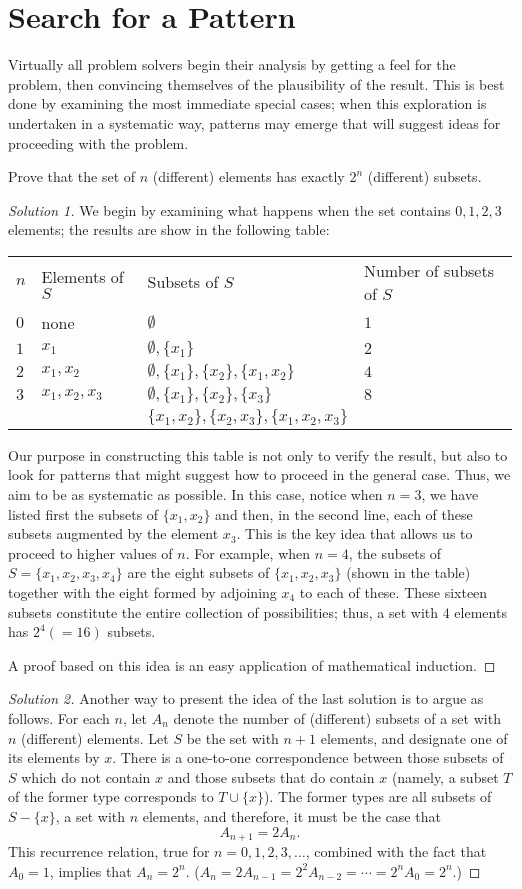 \section{Search for a Pattern}
Virtually all problem solvers begin their analysis by getting a feel for
the problem, then convincing themselves of the plausibility of the
result. This is best done by examining the most immediate special cases;
when this exploration is undertaken in a systematic way, patterns may
emerge that will suggest ideas for proceeding with the problem.
\begin{exercise}
Prove that the set of $n$ (different) elements has exactly $2^n$
(different) subsets.
\end{exercise}
\begin{proof}[Solution 1]
We begin by examining what happens when the set contains $0,1,2,3$
elements; the results are show in the following table:
\begin{tabular}{llll}
$n$&Elements of $S$&Subsets of $S$&Number of subsets of $S$\\
$0$&none&$\emptyset$&$1$\\
$1$&$x_1$&$\emptyset,\{x_1\}$&$2$\\
$2$&$x_1,x_2$&$\emptyset,\{x_1\},\{x_2\},\{x_1,x_2\}$&$4$\\
$3$&$x_1,x_2,x_3$&$\emptyset,\{x_1\},\{x_2\},\{x_3\}$&$8$\\
&&$\{x_1,x_2\},\{x_2,x_3\},\{x_1,x_2,x_3\}$
\end{tabular}

Our purpose in constructing this table is not only to verify the result,
but also to look for patterns that might suggest how to proceed in the
general case. Thus, we aim to be as systematic as possible. In this case,
notice when $n=3$, we have listed first the subsets of $\{x_1,x_2\}$ and
then, in the second line, each of these subsets augmented by the element
$x_3$. This is the key idea that allows us to proceed to higher values of
$n$. For example, when $n=4$, the subsets of $S=\{x_1,x_2,x_3,x_4\}$ are
the eight subsets of $\{x_1,x_2,x_3\}$ (shown in the table) together with
the eight formed by adjoining $x_4$ to each of these. These sixteen subsets
constitute the entire collection of possibilities; thus, a set with $4$
elements has $2^4(=16)$ subsets.

A proof based on this idea is an easy application of mathematical
induction.
\end{proof}
\begin{proof}[Solution 2]
Another way to present the idea of the last solution is to argue as
follows. For each $n$, let $A_n$ denote the number of (different) subsets
of a set with $n$ (different) elements. Let $S$ be the set with $n+1$
elements, and designate one of its elements by $x$. There is a one-to-one
correspondence between those subsets of $S$ which do not contain $x$ and
those subsets that do contain $x$ (namely, a subset $T$ of the former type
corresponds to $T\cup\{x\}$). The former types are all subsets of
$S\minus\{x\}$, a set with $n$ elements, and therefore, it must be the case
that
\[
A_{n+1}=2A_n.
\]
This recurrence relation, true for $n=0,1,2,3,\dotsc$, combined with the
fact that $A_0=1$, implies that
$A_n=2^n$. ($A_n=2A_{n-1}=2^2A_{n-2}=\cdots=2^nA_0=2^n$.)
\end{proof}
